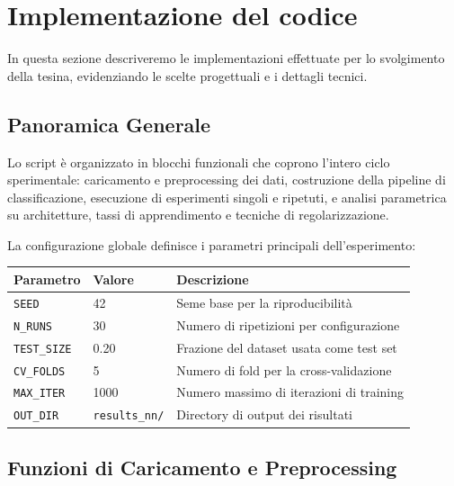\documentclass[11pt,a4paper]{article}
\begin{document}
\newpage
\section{Implementazione del codice}
In questa sezione descriveremo le implementazioni effettuate per lo svolgimento della tesina,
evidenziando le scelte progettuali e i dettagli tecnici.

\subsection{Panoramica Generale}

Lo script è organizzato in blocchi funzionali che coprono l'intero ciclo
sperimentale: caricamento e preprocessing dei dati, costruzione della pipeline
di classificazione, esecuzione di esperimenti singoli e ripetuti, e analisi
parametrica su architetture, tassi di apprendimento e tecniche di
regolarizzazione.

La configurazione globale definisce i parametri principali dell'esperimento:

\begin{center}
\begin{tabular}{lll}
\toprule
\textbf{Parametro} & \textbf{Valore} & \textbf{Descrizione} \\
\midrule
\texttt{SEED}       & 42    & Seme base per la riproducibilità \\
\texttt{N\_RUNS}    & 30    & Numero di ripetizioni per configurazione \\
\texttt{TEST\_SIZE} & 0.20  & Frazione del dataset usata come test set \\
\texttt{CV\_FOLDS}  & 5     & Numero di fold per la cross-validazione \\
\texttt{MAX\_ITER}  & 1000  & Numero massimo di iterazioni di training \\
\texttt{OUT\_DIR}   & \texttt{results\_nn/} & Directory di output dei risultati \\
\bottomrule
\end{tabular}
\end{center}

\subsection{Funzioni di Caricamento e Preprocessing}

\end{document}
